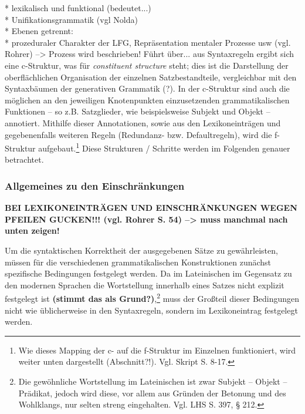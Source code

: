 \documentclass[12pt,a4paper]{article}
\begin{document}
* lexikalisch und funktional (bedeutet...) \\
* Unifikationsgrammatik (vgl Nolda) \\
* Ebenen getrennt: \\
* prozeduraler Charakter der LFG, Repräsentation mentaler Prozesse usw (vgl. Rohrer) --> Prozess wird beschrieben! Führt über... aus Syntaxregeln ergibt sich eine c-Struktur, was für \textit{constituent structure} steht; dies ist die Darstellung der oberflächlichen Organisation der einzelnen Satzbestandteile, vergleichbar mit den Syntaxbäumen der generativen Grammatik (?). In der c-Struktur sind auch die möglichen an den jeweiligen Knotenpunkten einzusetzenden grammatikalischen Funktionen -- so z.B. Satzglieder, wie beispielsweise Subjekt und Objekt -- annotiert. Mithilfe dieser Annotationen, sowie aus den Lexikoneinträgen und gegebenenfalls weiteren Regeln (Redundanz- bzw. Defaultregeln), wird die f-Struktur aufgebaut.\footnote{Wie dieses Mapping der c- auf die f-Struktur im Einzelnen funktioniert, wird weiter unten dargestellt (Abschnitt?!). Vgl. Skript S. 8-17.} Diese Strukturen / Schritte werden im Folgenden genauer betrachtet.




\subsubsection{Allgemeines zu den Einschränkungen}
\textbf{BEI LEXIKONEINTRÄGEN UND EINSCHRÄNKUNGEN WEGEN PFEILEN GUCKEN!!! (vgl. Rohrer S. 54) --> muss manchmal nach unten zeigen!}

Um die syntaktischen Korrektheit der ausgegebenen Sätze zu gewährleisten, müssen für die verschiedenen grammatikalischen Konstruktionen zunächst spezifische Bedingungen festgelegt werden.
Da im Lateinischen im Gegensatz zu den modernen Sprachen die Wortstellung innerhalb eines Satzes nicht explizit festgelegt ist \textbf{(stimmt das als Grund?)},\footnote{Die gewöhnliche Wortstellung im Lateinischen ist zwar Subjekt – Objekt – Prädikat, jedoch wird diese, vor allem aus Gründen der Betonung und des Wohlklangs, nur selten streng eingehalten. Vgl. LHS S. 397, § 212.} muss der Großteil dieser Bedingungen nicht wie üblicherweise in den Syntaxregeln, sondern im Lexikoneintrag festgelegt werden.
\end{document}
